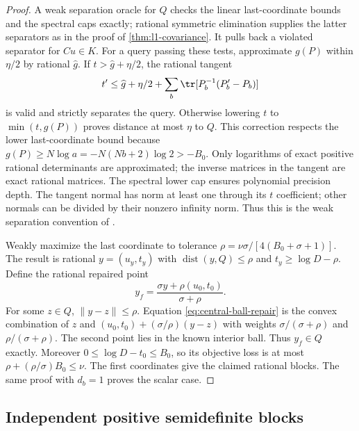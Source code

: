 \begin{proof}
A weak separation oracle for $Q$ checks the linear last-coordinate
bounds and the spectral caps exactly; rational symmetric elimination
supplies the latter separators as in the proof of
\cref{thm:l1-covariance}. It pulls back a violated separator for $Cu\in K$.
For a query passing these tests, approximate $g(P)$ within $\eta/2$ by
rational $\widehat g$. If $t>\widehat g+\eta/2$, the rational tangent
\begin{equation}\label{eq:logdet-tangent}
 t'\le\widehat g+\eta/2+
                  \sum_b\tr[P_b^{-1}(P_b'-P_b)]
\end{equation}
is valid and strictly separates the query. Otherwise lowering $t$ to
$\min(t,g(P))$ proves distance at most $\eta$ to $Q$. This correction
respects the lower last-coordinate bound because
$g(P)\ge N\log a=-N(Nb+2)\log2>-B_0$.
Only logarithms of exact positive rational determinants are approximated;
the inverse matrices in the tangent are exact rational matrices. The
spectral lower cap ensures polynomial precision depth. The tangent
normal has norm at least one through its $t$ coefficient; other normals
can be divided by their nonzero infinity norm. Thus this is the weak
separation convention of \citet[Theorem (3.1)]{gls1981}.

Weakly maximize the last coordinate to tolerance
$\rho=\nu\sigma/[4(B_0+\sigma+1)]$. The result is rational
$y=(u_y,t_y)$ with $\operatorname{dist}(y,Q)\le\rho$ and
$t_y\ge\log D-\rho$. Define the rational repaired point
\begin{equation}\label{eq:central-ball-repair}
 y_f=\frac{\sigma y+\rho(u_0,t_0)}{\sigma+\rho}.
\end{equation}
For some $z\in Q$, $\|y-z\|\le\rho$. Equation
\eqref{eq:central-ball-repair} is the convex combination of $z$ and
$(u_0,t_0)+(\sigma/\rho)(y-z)$ with weights
$\sigma/(\sigma+\rho)$ and $\rho/(\sigma+\rho)$. The second point
lies in the known interior ball. Thus $y_f\in Q$ exactly. Moreover
$0\le\log D-t_0\le B_0$, so its objective loss is at most
$\rho+(\rho/\sigma)B_0\le\nu$. The first coordinates give the claimed
rational blocks. The same proof with $d_b=1$ proves the scalar case.
\end{proof}

\subsection{Independent positive semidefinite blocks}

